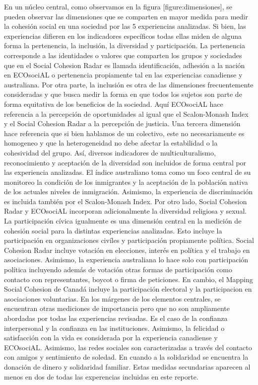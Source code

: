 \documentclass[
  12pt,
]{book}
\begin{document}
En un núcleo central, como observamos en la figura {[}figure:dimensiones{]},
se pueden observar las dimensiones que se comparten en mayor medida para
medir la cohesión social en una sociedad por las 5 experiencias
analizadas. Si bien, las experiencias difieren en los indicadores
específicos todas ellas miden de alguna forma la pertenencia, la
inclusión, la diversidad y participación. La pertenencia corresponde a
las identidades o valores que comparten los grupos y sociedades que en
el Social Cohesion Radar es llamada identificación, adhesión a la nación
en ECOsociAL o pertenencia propiamente tal en las experiencias
canadiense y australiana. Por otra parte, la inclusión es otra de las
dimensiones frecuentemente consideradas y que busca medir la forma en
que todos los sujetos son parte de forma equitativa de los beneficios de
la sociedad. Aquí ECOsociAL hace referencia a la percepción de
oportunidades al igual que el Scalon-Monash Index y el Social Cohesion
Radar a la percepción de justicia. Una tercera dimensión hace referencia
que si bien hablamos de un colectivo, este no necesariamente es
homogeneo y que la heterogeneidad no debe afectar la estabilidad o la
cohesividad del grupo. Así, diversos indicadores de multiculturalismo,
reconocimiento y aceptación de la diversidad son incluidos de forma
central por las experiencia analizadas. El índice australiano toma como
un foco central de su monitoreo la condición de los inmigrantes y la
aceptación de la población nativa de los actuales niveles de
inmigración. Asimismo, la experiencia de discriminación es incluida
también por el Scalon-Monash Index. Por otro lado, Social Cohesion Radar
y ECOsociAL incorporan adicionalmente la diversidad religiosa y sexual.
La participación cívica igualmente es una dimensión central en la
medición de cohesión social para la distintas experiencias analizadas.
Esto incluye la participación en organizaciones civíles y participación
propiamente política. Social Cohesion Radar incluye votación en
elecciones, interés en política y el trabajo en asociaciones. Asimismo,
la experiencia australiana lo hace solo con participación política
incluyendo además de votación otras formas de participación como
contacto con representantes, boycot o firma de peticiones. En cambio, el
Mapping Social Cohesion de Canadá incluye la participación electoral y
la participacion en asociaciones voluntarias. En los márgenes de los
elementos centrales, se encuentran otras mediciones de importancia pero
que no son ampliamente abordadas por todas las experiencias revisadas.
Es el caso de la confianza interpersonal y la confianza en las
instituciones. Asimismo, la felicidad o satisfacción con la vida es
considerada por la experiencia canadiense y ECOsociAL. Asimismo, las
redes sociales son caracterizadas a través del contacto con amigos y
sentimiento de soledad. En cuando a la solidaridad se encuentra la
donación de dinero y solidaridad familiar. Estas medidas secundarias
aparecen al menos en dos de todas las experencias incluidas en este
reporte.
\end{document}
